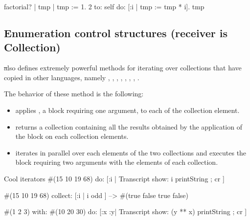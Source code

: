 \documentclass[a4paper,10pt,twoside]{book}
\begin{document}
\begin{script}{factorial?}\label{eg:fact}
| tmp |
tmp := 1.
2 to: self do: [:i | tmp := tmp * i].
tmp
\end{script}

\subsection{Enumeration control structures (receiver is Collection)}
\label{sec:loopCollection}
\st also defines extremely powerful methods for iterating over collections that have copied 
in other languages, namely  
  
  
, ,
, , , 
, , . 

The behavior of these method is the following: 
\begin{itemize}
\item {} applies , a block requiring one argument, to each of the collection element.

\item {} returns a collection containing all the results obtained by the application of the block  on each collection elements. 

\item {} iterates in parallel over each elements of the two collections and executes the block requiring two arguments with the elements of each collection. 
\end{itemize}

\begin{script}{Cool iterators}
#(15 10 19 68) do:  
   [:i | Transcript show: i printString ; cr ]

#(15 10 19 68) collect: [:i | i odd ]
   --> #(true false true false)

#(1 2 3) with: #(10 20 30) 
   do: [:x :y| Transcript show: (y ** x) printString ; cr ]
\end{script}
\end{document}
